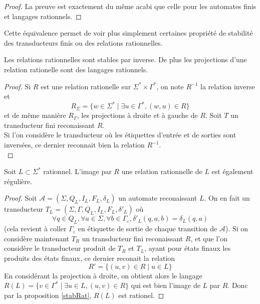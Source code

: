 \documentclass{scrartcl}
\begin{document}
\begin{flushleft}
\begin{proof}
    La preuve est exactement du même acabi que celle pour les automates finis et langages rationnels.
\end{proof}

Cette équivalence permet de voir plus simplement certaines propriété de stabilité des transducteurs finis ou des relations
rationnelles.
\begin{prop} \label{stabRat}
    Les relations rationnelles sont stables par inverse. De plus les projections d'une relation
    rationelle sont des langages rationnels.
\end{prop}

\begin{proof}
    Si $R$ est une relation rationelle sur $\Sigma^* \times \Gamma^*$, on note $R^{-1}$ la relation inverse et
    \[ R_{\Sigma} = \{ w \in \Sigma^* \mid \exists u \in \Gamma^*, (w, u) \in R \} \]
    et de même manière $R_{\Gamma}$, les projections à droite et à gauche de $R$. Soit $T$ un transducteur fini reconaissant $R$.\\
    Si l'on considère le transducteur où les étiquettes d'entrée et de sorties sont inversées, ce dernier reconnait bien la
    relation $R^{-1}$.\\
\end{proof}

\begin{prop} \label{imageRat}
    Soit $L \subset \Sigma^*$ rationnel. L'image par $R$ une relation rationnelle de $L$ est également régulière.
\end{prop}

\begin{proof}
    Soit $\mathcal{A} = (\Sigma, Q_L, I_L, F_L, \delta_L)$ un automate reconaissant $L$. On en fait un transducteur
    $T_L = (\Sigma, \Gamma, Q_L, I_L, F_L, \delta'_L)$ où
    \[ \forall q \in Q_L, \forall a \in \Sigma, \forall b \in \Gamma_{\varepsilon}, \delta'_L(q, a, b) = \delta_L(q, a) \]
    (cela revient à coller $\Gamma_{\varepsilon}$ en étiquette de sortie de chaque transition de $\mathcal{A}$). Si on considère
    maintenant $T_R$ un transducteur fini reconaissant $R$, et que l'on considère le transducteur produit de $T_R$ et $T_L$,
    ayant pour états finaux les produits des états finaux, ce dernier reconait la relation
    \[ R' = \{ (u, v) \in R \mid u \in L \} \]
    En considérant la projection à droite, on obtient alors le langage $R(L) = \{ v \in \Gamma^* \mid \exists u \in L, (u, v) \in R \}$
    qui est bien l'image de $L$ par $R$. Donc par la proposition \ref{stabRat}, $R(L)$ est rationel.
\end{proof}


\end{flushleft}
\end{document}
